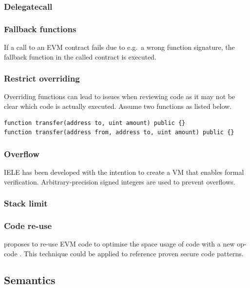 \subsubsection{Delegatecall}

\subsubsection{Fallback functions}
If a call to an EVM contract fails due to e.g.\ a wrong function signature, the fallback function in the called contract is executed.

\subsubsection{Restrict overriding}
Overriding functions can lead to issues when reviewing code as it may not be clear which code is actually executed. Assume two functions as listed below.
\begin{lstlisting}[caption={Function overriding with different inputs.},label=lst:tail-call,language=Solidity]
function transfer(address to, uint amount) public {}
function transfer(address from, address to, uint amount) public {}
\end{lstlisting}

\subsubsection{Overflow}
IELE has been developed with the intention to create a VM that enables formal verification. Arbitrary-precision signed integers are used to prevent overflows.

\subsubsection{Stack limit}


\subsubsection{Code re-use}
\citeauthor{Pontiveros2018} proposes to re-use EVM code to optimise the space usage of code with a new op-code \cite{Pontiveros2018}. This technique could be applied to reference proven secure code patterns.

\subsection{Semantics}

